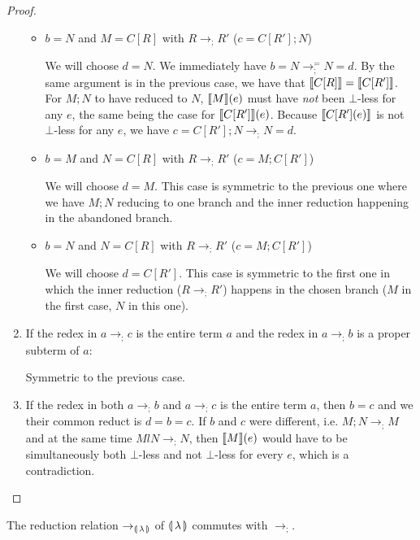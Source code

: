 \begin{proof}
\begin{enumerate}
\begin{itemize}
    \item $b = N$ and $M = C[R]$ with $R \to_; R'$ ($c = C[R']; N$)

      We will choose $d = N$. We immediately have $b = N \to_;^= N = d$. By
      the same argument is in the previous case, we have that
      $\llbracket C[R] \rrbracket = \llbracket C[R'] \rrbracket$. For $M; N$ to have reduced to $N$,
      $\llbracket M \rrbracket(e)$ must have \emph{not} been $\bot$-less for any $e$, the
      same being the case for $\llbracket C[R'] \rrbracket(e)$. Because $\llbracket C[R'](e) \rrbracket$ is
      not $\bot$-less for any $e$, we have $c = C[R']; N \to_; N = d$.

    \item $b = M$ and $N = C[R]$ with $R \to_; R'$ ($c = M; C[R']$)

      We will choose $d = M$. This case is symmetric to the previous one
      where we have $M; N$ reducing to one branch and the inner reduction
      happening in the abandoned branch.

    \item $b = N$ and $N = C[R]$ with $R \to_; R'$ ($c = M; C[R']$)

      We will choose $d = C[R']$. This case is symmetric to the first one
      in which the inner reduction ($R \to_; R'$) happens in the chosen
      branch ($M$ in the first case, $N$ in this one).
    \end{itemize}

  \item If the redex in $a \to_; c$ is the entire term $a$ and the redex in
    $a \to_; b$ is a proper subterm of $a$:

    Symmetric to the previous case.

  \item If the redex in both $a \to_; b$ and $a \to_; c$ is the entire term
    $a$, then $b = c$ and we their common reduct is $d = b = c$. If $b$ and
    $c$ were different, i.e. $M; N \to_; M$ and at the same time
    $Ml N \to_; N$, then $\llbracket M \rrbracket(e)$ would have to be simultaneously both
    $\bot$-less and not $\bot$-less for every $e$, which is a
    contradiction.
  \end{enumerate}
\end{proof}

\begin{lemma}\label{lem:semicolon-commutes}
  The reduction relation $\to_{\llparenthesis \, \lambda \, \rrparenthesis}$ of ${\llparenthesis \, \lambda \, \rrparenthesis}$ commutes with $\to_;$.
\end{lemma}

